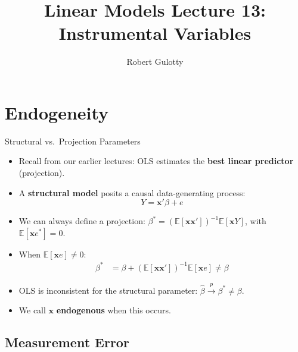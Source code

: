 \documentclass[aspectratio=169, handout]{beamer}
\title[PLSC 30700]{Linear Models Lecture 13: Instrumental Variables}
\author{Robert Gulotty}
\institute[Chicago]{University of Chicago}
\numberwithin{equation}{section}
\begin{document}
\begin{frame}
\maketitle
\end{frame}

\section{Endogeneity}

\begin{frame}{Structural vs.\ Projection Parameters}
\begin{itemize}
\item Recall from our earlier lectures: OLS estimates the \textbf{best linear predictor} (projection).
\item A \textbf{structural model} posits a causal data-generating process:
$$Y = \bm{x}'\beta + e$$
\item We can always define a projection: $\beta^*=(\mathbb{E}[\bm{x}\bm{x}'])^{-1}\mathbb{E}[\bm{x}Y]$, with $\mathbb{E}[\bm{x}e^*]=0$.
\item When $\mathbb{E}[\bm{x}e]\neq 0$:
\begin{align*}
\beta^*&=\beta+(\mathbb{E}[\bm{x}\bm{x}'])^{-1}\mathbb{E}[\bm{x}e]\neq \beta
\end{align*}
\item OLS is \alert{inconsistent} for the structural parameter:  $\hat{\beta}\xrightarrow{p}\beta^*\neq\beta$.
\item We call $\bm{x}$ \textbf{endogenous} when this occurs.
\end{itemize}
\end{frame}


\subsection{Measurement Error}
\end{document}
